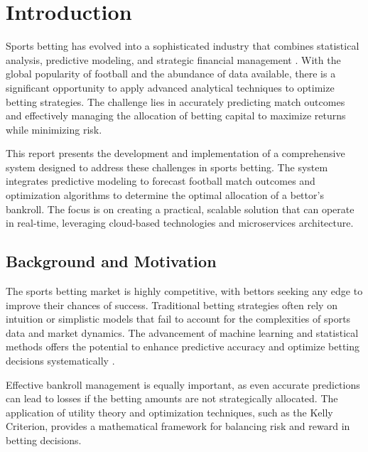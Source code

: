 \documentclass[10pt]{report}
\begin{document}


\chapter{Introduction}

Sports betting has evolved into a sophisticated industry that combines statistical analysis, predictive modeling, and strategic financial management \cite{AndersonSally2013}. With the global popularity of football and the abundance of data available, there is a significant opportunity to apply advanced analytical techniques to optimize betting strategies. The challenge lies in accurately predicting match outcomes and effectively managing the allocation of betting capital to maximize returns while minimizing risk.

This report presents the development and implementation of a comprehensive system designed to address these challenges in sports betting. The system integrates predictive modeling to forecast football match outcomes and optimization algorithms to determine the optimal allocation of a bettor's bankroll. The focus is on creating a practical, scalable solution that can operate in real-time, leveraging cloud-based technologies and microservices architecture.

\section{Background and Motivation}

The sports betting market is highly competitive, with bettors seeking any edge to improve their chances of success. Traditional betting strategies often rely on intuition or simplistic models that fail to account for the complexities of sports data and market dynamics. The advancement of machine learning and statistical methods offers the potential to enhance predictive accuracy and optimize betting decisions systematically \cite{CainEtAl2000}.

Effective bankroll management is equally important, as even accurate predictions can lead to losses if the betting amounts are not strategically allocated. The application of utility theory and optimization techniques, such as the Kelly Criterion, provides a mathematical framework for balancing risk and reward in betting decisions. 
\end{document}
